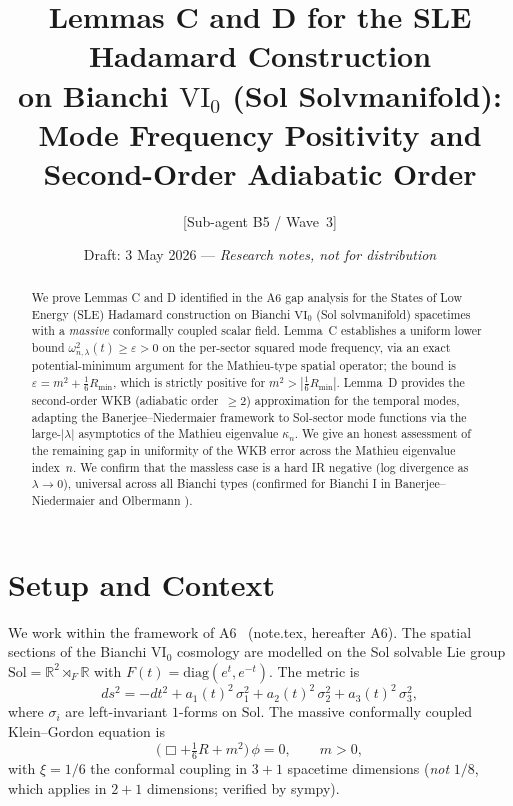 \documentclass[11pt,a4paper]{article}
\title{Lemmas C and D for the SLE Hadamard Construction\\
       on Bianchi $\mathrm{VI_0}$ (Sol Solvmanifold):\\
       Mode Frequency Positivity and Second-Order Adiabatic Order}
\author{[Sub-agent B5 / Wave~3]}
\date{Draft: 3 May 2026 --- \emph{Research notes, not for distribution}}
\theoremstyle{definition}
\newcommand{\Sol}{\mathrm{Sol}}
\newcommand{\R}{\mathbb{R}}
\begin{document}
\maketitle

\begin{abstract}
We prove Lemmas C and D identified in the A6 gap analysis for the
States of Low Energy (SLE) Hadamard construction on Bianchi $\mathrm{VI_0}$
(Sol solvmanifold) spacetimes with a \emph{massive} conformally coupled scalar field.
Lemma~C establishes a uniform lower bound $\omega^2_{n,\lambda}(t) \geq \varepsilon > 0$
on the per-sector squared mode frequency, via an exact potential-minimum argument
for the Mathieu-type spatial operator; the bound is $\varepsilon = m^2 + \tfrac{1}{6}R_{\min}$,
which is strictly positive for $m^2 > |\tfrac{1}{6}R_{\min}|$.
Lemma~D provides the second-order WKB (adiabatic order~$\geq 2$) approximation for the
temporal modes, adapting the Banerjee--Niedermaier framework to Sol-sector mode functions
via the large-$|\lambda|$ asymptotics of the Mathieu eigenvalue $\kappa_n$.
We give an honest assessment of the remaining gap in uniformity of the WKB
error across the Mathieu eigenvalue index~$n$.
We confirm that the massless case is a hard IR negative (log divergence as
$\lambda \to 0$), universal across all Bianchi types (confirmed for Bianchi I
in Banerjee--Niedermaier \cite{BN23} and Olbermann \cite{Olb07}).
\end{abstract}

\tableofcontents

\section{Setup and Context}
\label{sec:setup}

We work within the framework of A6~\cite{A6draft} (note.tex, hereafter A6).
The spatial sections of the Bianchi $\mathrm{VI_0}$ cosmology are modelled on the
Sol solvable Lie group $\Sol = \R^2 \rtimes_F \R$ with $F(t) = \mathrm{diag}(e^t, e^{-t})$.
The metric is
\begin{equation}\label{eq:metric}
  ds^2 = -dt^2 + a_1(t)^2\,\sigma_1^2 + a_2(t)^2\,\sigma_2^2 + a_3(t)^2\,\sigma_3^2,
\end{equation}
where $\sigma_i$ are left-invariant $1$-forms on $\Sol$.
The massive conformally coupled Klein--Gordon equation is
\begin{equation}\label{eq:KG}
  \bigl(\Box + \tfrac{1}{6} R + m^2\bigr)\,\phi = 0, \qquad m > 0,
\end{equation}
with $\xi = 1/6$ the conformal coupling in $3{+}1$ spacetime dimensions
(\emph{not} $1/8$, which applies in $2{+}1$ dimensions; verified by sympy).
\end{document}
